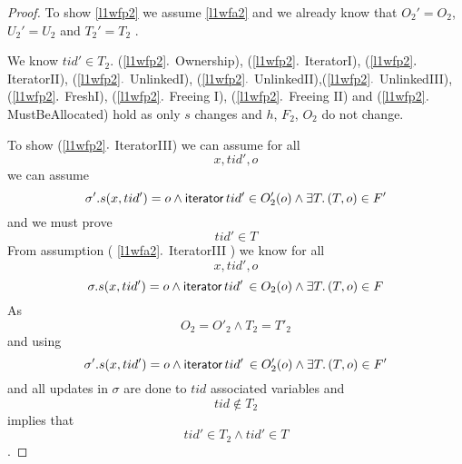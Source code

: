 \begin{proof}

To show \ref{l1wfp2} we assume \ref{l1wfa2} and we already know that $O_{2}' = O_{2}$,  $U_{2}' = U_{2}$ and $T_{2}' = T_{2}$  .

 We know $tid' \in T_{2}$. (\ref{l1wfp2}$\ldotp$ \textsf{Ownership}), (\ref{l1wfp2}$\ldotp$ \textsf{IteratorI}), (\ref{l1wfp2}$\ldotp$ \textsf{IteratorII}), (\ref{l1wfp2}$\ldotp$ \textsf{UnlinkedI}), (\ref{l1wfp2}$\ldotp$ \textsf{UnlinkedII}),(\ref{l1wfp2}$\ldotp$ \textsf{UnlinkedIII}), (\ref{l1wfp2}$\ldotp$ \textsf{FreshI}), (\ref{l1wfp2}$\ldotp$ \textsf{Freeing I}), (\ref{l1wfp2}$\ldotp$ \textsf{Freeing II}) and (\ref{l1wfp2}$\ldotp$ \textsf{MustBeAllocated}) hold as only $s$ changes and $h$, $F_{2}$, $O_{2}$ do not change. 

\begin{comment}
For proof of  \ref{l1wfp2}$\ldotp$ \textsf{FreshII}, we can assume that 
\[o = O_{2}(x,t) \land o' = O'_{2}(x,t)\]
and we know that 
\[
\sigma' = \sigma [  \sigma.s(x,t) \mapsto \sigma.h(x,f) ]   \land \sigma.h = \sigma.h' 
\]
As heap does not change and assuming that 

\[ \mathsf{fresh} \in O_{2}'(o') \]

there exists only one action that preserves observation of a thread for a node as \textsf{fresh}
\[
\Gamma,\, x:\textsf{fresh } f\,\_ \vdash_{M} x.f := z \dashv x:\textsf{fresh }f\,z \,,\Gamma
\]
 which is a mutator action and this implies that 

\[t = l\]

For another case of \ref{l1wfp2}$\ldotp$ \textsf{FreshII} where 

\[t\in T_{2} \land t \in R\]

proof is trivial.
\end{comment}

To show (\ref{l1wfp2}$\ldotp$ \textsf{IteratorIII}) we can assume for all \[x,tid', o\]
we can assume 
\[ \sigma'.s(x,tid') = o \land \mathsf{iterator} \, tid' \in O'_{2}(o) \land \exists T \ldotp (T,o)  \in F' \]
and we must prove 
\[tid' \in T\]
From assumption ( \ref{l1wfa2}$\ldotp$ \textsf{IteratorIII} ) we know for all \[x,tid',o\] 
\[\sigma.s(x,tid') = o \land \mathsf{iterator} \, tid' \, \in O_{2}(o) \land \exists T \ldotp (T,o) \in F \]
As
\[O_{2} = O'_{2} \land T_{2} = T'_{2}\]
and using 
\[\sigma'.s(x,tid') = o \land \mathsf{iterator} \, tid' \, \in O'_{2}(o) \land \exists T \ldotp (T,o) \in F' \]
and 
all updates in $\sigma$ are done to $tid$ associated variables and \[tid \notin T_{2}\]
implies that 
\[tid' \in T_{2} \land tid' \in T\].


\end{proof}
